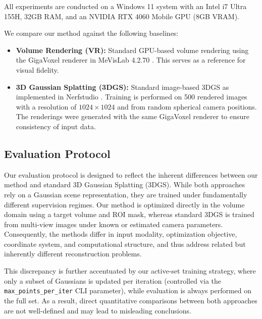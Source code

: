 \documentclass[runningheads]{llncs}
\begin{document}
All experiments are conducted on a Windows 11 system with an Intel i7 Ultra 155H, 32GB RAM, and an NVIDIA RTX 4060 Mobile GPU (8GB VRAM).


\vspace{1em}
We compare our method against the following baselines:

\begin{itemize}
\item \textbf{Volume Rendering (VR):} Standard GPU-based volume rendering using the GigaVoxel renderer in MeVisLab 4.2.70 \cite{mevislab}. This serves as a reference for visual fidelity.

\item \textbf{3D Gaussian Splatting (3DGS):} Standard image-based 3DGS as implemented in Nerfstudio \cite{nerfstudio}. Training is performed on 500 rendered images with a resolution of $1024 \times 1024$ and from random spherical camera positions. The renderings were generated with the same GigaVoxel renderer to ensure consistency of input data.
\end{itemize}

\subsection{Evaluation Protocol}
\label{sec:evaluation}

Our evaluation protocol is designed to reflect the inherent differences between our method and standard 3D Gaussian Splatting (3DGS). While both approaches rely on a Gaussian scene representation, they are trained under fundamentally different supervision regimes. Our method is optimized directly in the volume domain using a target volume and ROI mask, whereas standard 3DGS is trained from multi-view images under known or estimated camera parameters. Consequently, the methods differ in input modality, optimization objective, coordinate system, and computational structure, and thus address related but inherently different reconstruction problems.

This discrepancy is further accentuated by our active-set training strategy, where only a subset of Gaussians is updated per iteration (controlled via the \texttt{max\_points\_per\_iter} CLI parameter), while evaluation is always performed on the full set. As a result, direct quantitative comparisons between both approaches are not well-defined and may lead to misleading conclusions. %
\end{document}
